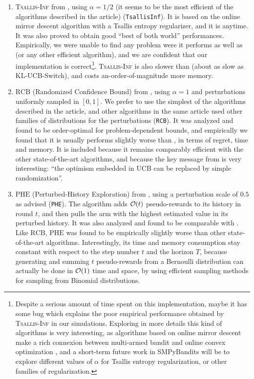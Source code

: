 \begin{enumerate}
    \item
    \textsc{Tsallis-Inf} from \cite{Zimmert2018}, using $\alpha=1/2$ (it seems to be the most efficient of the algorithms described in the article) (\texttt{TsallisInf}).
    It is based on the online mirror descent algorithm with a Tsallis entropy regularizer, and it is anytime.
    It was also proved to obtain good ``best of both world'' performances.
    Empirically, we were unable to find any problem were it performs as well as \UCB{} (or any other efficient algorithm), and we are confident that our implementation is correct\footnote{Despite a serious amount of time spent on this implementation, maybe it has some bug which explains the poor empirical performance obtained by \textsc{Tsallis-Inf} in our simulations. Exploring in more details this kind of algorithms is very interesting, as algorithms based on online mirror descent make a rich connexion between multi-armed bandit and online convex optimization \cite{Hazan2016introduction}, and a short-term future work in SMPyBandits will be to explore different values of $\alpha$ for Tsallis entropy regularization, or other families of regularization.}.
    \textsc{Tsallis-Inf} is also slower than \UCB{} (about as slow as KL-UCB-Switch), and costs an-order-of-magnitude more memory.

    \item
    $\mathrm{RCB}$ (Randomized Confidence Bound) from \cite{KimTewari2019}, using $\alpha=1$ and perturbations uniformly sampled in $[0,1]$. We prefer to use the simplest of the algorithms described in the article, and other algorithms in the same article used other families of distributions for the perturbations (\texttt{RCB}).
    It was analyzed and found to be order-optimal for problem-dependent bounds, and empirically we found that it is usually performs slightly worse than \UCB, in terms of regret, time and memory.
    It is included because it remains comparably efficient with the other state-of-the-art algorithms, and because the key message from \cite{KimTewari2019} is very interesting:
    ``the optimism embedded in UCB can be replaced by simple randomization''.

    \item
    $\mathrm{PHE}$ (Perturbed-History Exploration) from \cite{KvetonSzepesvari2019}, using a perturbation scale of $0.5$ as advised (\texttt{PHE}).
    The algorithm adds $\mathcal{O}(t)$ \iid{} pseudo-rewards to its history in round $t$, and then pulls the arm with the highest estimated value in its perturbed history.
    It was also analyzed and found to be comparable with \UCB.
    Like $\mathrm{RCB}$, $\mathrm{PHE}$ was found to be empirically slightly worse than other state-of-the-art algorithms.
    Interestingly, its time and memory consumption stay constant with respect to the step number $t$ and the horizon $T$, because generating and summing $t$ pseudo-rewards from a Bernoulli distribution can actually be done in $\mathcal{O}(1)$ time and space, by using efficient sampling methods for sampling from Binomial distributions.
\end{enumerate}

